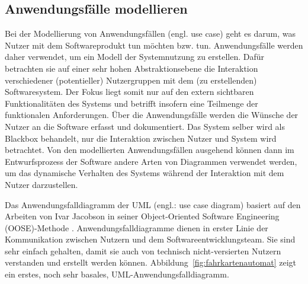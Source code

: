\subsection{Anwendungsfälle modellieren}
\label{sec:Kap-6.3.1}

Bei der Modellierung von Anwendungsfällen (engl. use case) geht es darum, was Nutzer mit dem Softwareprodukt tun möchten bzw. tun. Anwendungsfälle werden daher verwendet, um ein Modell der Systemnutzung zu erstellen.  Dafür betrachten sie auf einer sehr hohen Abstraktionsebene die Interaktion verschiedener (potentieller) Nutzergruppen mit dem (zu erstellenden) Softwaresystem. Der Fokus liegt somit nur auf den extern sichtbaren Funktionalitäten des Systems und betrifft insofern eine Teilmenge der funktionalen Anforderungen. Über die Anwendungsfälle werden die Wünsche der Nutzer an die Software erfasst und dokumentiert. Das System selber wird als Blackbox behandelt, nur die Interaktion zwischen Nutzer und System wird betrachtet. Von den modellierten Anwendungsfällen ausgehend können dann im Entwurfsprozess der Software andere Arten von Diagrammen verwendet werden, um das dynamische Verhalten des Systems während der Interaktion mit dem Nutzer darzustellen. 

Das Anwendungsfalldiagramm der UML (engl.: use case diagram) basiert auf den Arbeiten von Ivar Jacobson in seiner Object-Oriented Software Engineering (OOSE)-Methode \cite{jac92}. Anwendungsfalldiagramme dienen in erster Linie der Kommunikation zwischen Nutzern und dem Softwareentwicklungsteam. Sie sind sehr einfach gehalten, damit sie auch von technisch nicht-versierten Nutzern verstanden und erstellt werden können. Abbildung~\ref{fig:fahrkartenautomat} zeigt ein erstes, noch sehr basales, UML-Anwendungsfalldiagramm.

